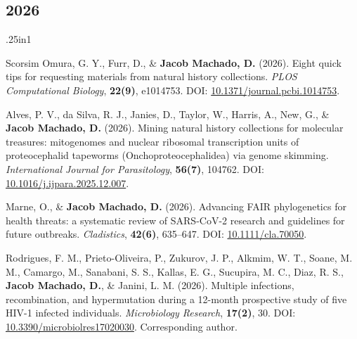 \documentclass[11pt, letterpaper, sans]{moderncv}
\begin{document}


\subsection{2026}

	{\setlength{\parskip}{.5em}\renewcommand{\baselinestretch}{2.0}\begin{hangparas}{.25in}{1}

        Scorsim Omura, G. Y., Furr, D., \& \textbf{Jacob Machado, D.} (2026). Eight quick tips for requesting materials from natural history collections. \textit{PLOS Computational Biology}, \textbf{22(9)}, e1014753. DOI: \href{https://doi.org/10.1371/journal.pcbi.1014753}{10.1371/journal.pcbi.1014753}.

        Alves, P. V., da Silva, R. J., Janies, D., Taylor, W., Harris, A., New, G., \& \textbf{Jacob Machado, D.} (2026). Mining natural history collections for molecular treasures: mitogenomes and nuclear ribosomal transcription units of proteocephalid tapeworms (Onchoproteocephalidea) via genome skimming. \textit{International Journal for Parasitology}, \textbf{56(7)}, 104762. DOI: \href{https://doi.org/10.1016/j.ijpara.2025.12.007}{10.1016/j.ijpara.2025.12.007}.

        Marne, O., \& \textbf{Jacob Machado, D.} (2026). Advancing FAIR phylogenetics for health threats: a systematic review of SARS-CoV-2 research and guidelines for future outbreaks. \textit{Cladistics}, \textbf{42(6)}, 635--647. DOI: \href{https://doi.org/10.1111/cla.70050}{10.1111/cla.70050}.

        Rodrigues, F. M., Prieto-Oliveira, P., Zukurov, J. P., Alkmim, W. T., Soane, M. M., Camargo, M., Sanabani, S. S., Kallas, E. G., Sucupira, M. C., Diaz, R. S., \textbf{Jacob Machado, D.}, \& Janini, L. M. (2026). Multiple infections, recombination, and hypermutation during a 12-month prospective study of five HIV-1 infected individuals. \textit{Microbiology Research}, \textbf{17(2)}, 30. DOI: \href{https://doi.org/10.3390/microbiolres17020030}{10.3390/microbiolres17020030}. Corresponding author.

	\end{hangparas}}

\end{document}
